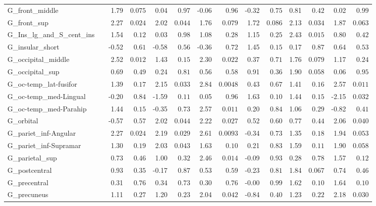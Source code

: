 {\begin{longtable}{llrrrrrrrrrrrr}
G\_front\_middle &  & 1.79 & $0.075$ & 0.04 & $0.97$ & -0.06 & $0.96$ & -0.32 & $0.75$ & 0.81 & $0.42$ & 0.02 & $0.99$ \\
G\_front\_sup &  & 2.27 & $0.024$ & 2.02 & $0.044$ & 1.76 & $0.079$ & 1.72 & $0.086$ & 2.13 & $0.034$ & 1.87 & $0.063$ \\
G\_Ins\_lg\_and\_S\_cent\_ins &  & 1.54 & $0.12$ & 0.03 & $0.98$ & 1.08 & $0.28$ & 1.15 & $0.25$ & 2.43 & $0.015$ & 0.80 & $0.42$ \\
G\_insular\_short &  & -0.52 & $0.61$ & -0.58 & $0.56$ & -0.36 & $0.72$ & 1.45 & $0.15$ & 0.17 & $0.87$ & 0.64 & $0.53$ \\
G\_occipital\_middle &  & 2.52 & $0.012$ & 1.43 & $0.15$ & 2.30 & $0.022$ & 0.37 & $0.71$ & 1.76 & $0.079$ & 1.17 & $0.24$ \\
G\_occipital\_sup &  & 0.69 & $0.49$ & 0.24 & $0.81$ & 0.56 & $0.58$ & 0.91 & $0.36$ & 1.90 & $0.058$ & 0.06 & $0.95$ \\
G\_oc-temp\_lat-fusifor &  & 1.39 & $0.17$ & 2.15 & $0.033$ & 2.84 & $0.0048$ & 0.43 & $0.67$ & 1.41 & $0.16$ & 2.57 & $0.011$ \\
G\_oc-temp\_med-Lingual &  & -0.20 & $0.84$ & -1.59 & $0.11$ & 0.05 & $0.96$ & 1.63 & $0.10$ & 1.44 & $0.15$ & -2.15 & $0.032$ \\
G\_oc-temp\_med-Parahip &  & 1.44 & $0.15$ & -0.35 & $0.73$ & 2.57 & $0.011$ & 0.20 & $0.84$ & 1.06 & $0.29$ & -0.82 & $0.41$ \\
G\_orbital &  & -0.57 & $0.57$ & 2.02 & $0.044$ & 2.22 & $0.027$ & 0.52 & $0.60$ & 0.77 & $0.44$ & 2.06 & $0.040$ \\
G\_pariet\_inf-Angular &  & 2.27 & $0.024$ & 2.19 & $0.029$ & 2.61 & $0.0093$ & -0.34 & $0.73$ & 1.35 & $0.18$ & 1.94 & $0.053$ \\
G\_pariet\_inf-Supramar &  & 1.30 & $0.19$ & 2.03 & $0.043$ & 1.63 & $0.10$ & 0.21 & $0.83$ & 1.59 & $0.11$ & 1.90 & $0.058$ \\
G\_parietal\_sup &  & 0.73 & $0.46$ & 1.00 & $0.32$ & 2.46 & $0.014$ & -0.09 & $0.93$ & 0.28 & $0.78$ & 1.57 & $0.12$ \\
G\_postcentral &  & 0.93 & $0.35$ & -0.17 & $0.87$ & 0.53 & $0.59$ & -0.23 & $0.81$ & 1.84 & $0.067$ & 0.74 & $0.46$ \\
G\_precentral &  & 0.31 & $0.76$ & 0.34 & $0.73$ & 0.30 & $0.76$ & -0.00 & $0.99$ & 1.62 & $0.10$ & 1.64 & $0.10$ \\
G\_precuneus &  & 1.11 & $0.27$ & 1.20 & $0.23$ & 2.04 & $0.042$ & -0.84 & $0.40$ & 1.23 & $0.22$ & 2.18 & $0.030$ \\

\end{longtable}}
